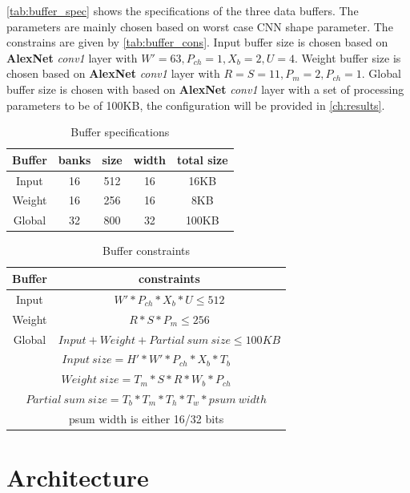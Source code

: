 \autoref{tab:buffer_spec} shows the specifications of the three data buffers. The parameters are mainly chosen based on worst case CNN shape parameter. The constrains are given by \autoref{tab:buffer_cons}. Input buffer size is chosen based on \textbf{AlexNet} \textit{conv1} layer with $W'=63,P_{ch}=1,X_b=2,U=4$. Weight buffer size is chosen based on \textbf{AlexNet} \textit{conv1} layer with $R=S=11,P_m=2,P_{ch}=1$. Global buffer size is chosen with based on \textbf{AlexNet} \textit{conv1} layer with a set of processing parameters to be of 100KB, the configuration will be provided in \autoref{ch:results}. 
\begin{table}[h] 
    \caption{Buffer specifications}
    \label{tab:buffer_spec}
    \centering
    \footnotesize 
        \begin{tabular}{c|cccc}
        \toprule
        Buffer  & banks & size & width & total size \\
        \midrule
        Input & 16 & 512 & 16 & 16KB\\
        Weight & 16 & 256 & 16 & 8KB\\
        Global & 32 & 800 & 32 & 100KB\\
        \bottomrule
        \end{tabular}
\end{table}
\begin{table}[h]
    \caption{Buffer constraints}
    \label{tab:buffer_cons}
    \centering
    \footnotesize 
        \begin{tabular}{c|c}
        \toprule
        Buffer &  constraints\\
        \midrule
        Input & $W'*P_{ch}*X_b*U \leq 512$\\
        Weight & $R*S*P_m \leq 256$\\
        Global & $Input+Weight+Partial\ sum\ size \leq 100KB$ \\
        \midrule
        \multicolumn{2}{c}{$Input\ size= H'*W'*P_{ch}*X_b*T_b$}\\
        \multicolumn{2}{c}{$Weight\ size= T_m*S*R*W_b*P_{ch}$}\\
        \multicolumn{2}{c}{$Partial\ sum\ size =T_b*T_m*T_h*T_w*psum\ width$}\\
        \bottomrule
        \multicolumn{2}{c}{psum width is either 16/32 bits}
        \end{tabular}
\end{table}
\section{Architecture}
